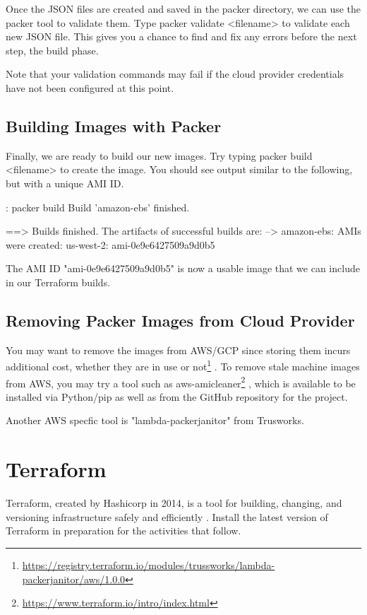 \justify
Once the JSON files are created and saved in the packer directory, we
can use the packer tool to validate them. Type
packer validate \textless{}filename\textgreater{} to validate each new
JSON file. This gives you a chance to find and fix any errors before the
next step, the build phase.

\justify
Note that your validation commands may fail if the cloud provider
credentials have not been configured at this point.

\subsection{Building Images with Packer}

\justify
Finally, we are ready to build our new images. Try typing
packer build \textless{}filename\textgreater{} to create the image. You
should see output similar to the following, but with a unique AMI ID.

\begin{mybox}{\thetcbcounter: packer build}
Build 'amazon-ebs' finished.

==> Builds finished. The artifacts of successful builds are:
--> amazon-ebs: AMIs were created:
    us-west-2: ami-0e9e6427509a9d0b5
\end{mybox}

\justify
The AMI ID "ami-0e9e6427509a9d0b5" is now a usable image that we can
include in our Terraform builds.

\subsection{Removing Packer Images from Cloud Provider}

\justify
You may want to remove the images from AWS/GCP since storing them incurs
additional cost, whether they are in use or not\footnote{\url{https://registry.terraform.io/modules/trussworks/lambda-packerjanitor/aws/1.0.0}}
.
\justify
To remove stale machine images from AWS, you may try a tool such as
aws-amicleaner\footnote{\url{https://www.terraform.io/intro/index.html}}
, which is available to be installed via Python/pip as well as from the
GitHub repository for the project.

\jusitfy
Another AWS specfic tool is "lambda-packerjanitor" from Trusworks.

\section{Terraform}
\justify
Terraform, created by Hashicorp in 2014, is a tool for building, changing, and versioning 
infrastructure safely and efficiently . Install the latest version of Terraform
in preparation for the activities that follow.

